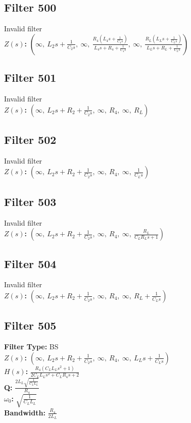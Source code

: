 \documentclass{article}
\begin{document}
\subsection*{Filter 500}
Invalid filter \\ 
\textbf{$Z(s)$:} $\left( \infty, \  L_{2} s + \frac{1}{C_{2} s}, \  \infty, \  \frac{R_{4} \left(L_{4} s + \frac{1}{C_{4} s}\right)}{L_{4} s + R_{4} + \frac{1}{C_{4} s}}, \  \infty, \  \frac{R_{L} \left(L_{L} s + \frac{1}{C_{L} s}\right)}{L_{L} s + R_{L} + \frac{1}{C_{L} s}}\right)$ \\ 
\subsection*{Filter 501}
Invalid filter \\ 
\textbf{$Z(s)$:} $\left( \infty, \  L_{2} s + R_{2} + \frac{1}{C_{2} s}, \  \infty, \  R_{4}, \  \infty, \  R_{L}\right)$ \\ 
\subsection*{Filter 502}
Invalid filter \\ 
\textbf{$Z(s)$:} $\left( \infty, \  L_{2} s + R_{2} + \frac{1}{C_{2} s}, \  \infty, \  R_{4}, \  \infty, \  \frac{1}{C_{L} s}\right)$ \\ 
\subsection*{Filter 503}
Invalid filter \\ 
\textbf{$Z(s)$:} $\left( \infty, \  L_{2} s + R_{2} + \frac{1}{C_{2} s}, \  \infty, \  R_{4}, \  \infty, \  \frac{R_{L}}{C_{L} R_{L} s + 1}\right)$ \\ 
\subsection*{Filter 504}
Invalid filter \\ 
\textbf{$Z(s)$:} $\left( \infty, \  L_{2} s + R_{2} + \frac{1}{C_{2} s}, \  \infty, \  R_{4}, \  \infty, \  R_{L} + \frac{1}{C_{L} s}\right)$ \\ 
\subsection*{Filter 505}
\textbf{Filter Type:} BS \\ 
\textbf{$Z(s)$:} $\left( \infty, \  L_{2} s + R_{2} + \frac{1}{C_{2} s}, \  \infty, \  R_{4}, \  \infty, \  L_{L} s + \frac{1}{C_{L} s}\right)$ \\ 
\textbf{$H(s)$:} $\frac{R_{4} \left(C_{L} L_{L} s^{2} + 1\right)}{2 C_{L} L_{L} s^{2} + C_{L} R_{4} s + 2}$ \\ 
\textbf{Q:} $\frac{2 L_{L} \sqrt{\frac{1}{C_{L} L_{L}}}}{R_{4}}$ \\ 
\textbf{$\omega_0$:} $\sqrt{\frac{1}{C_{L} L_{L}}}$ \\ 
\textbf{Bandwidth:} $\frac{R_{4}}{2 L_{L}}$ \\ 
\end{document}
